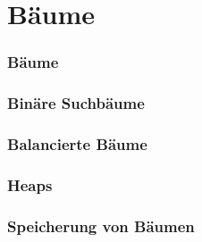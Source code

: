 \documentclass[handout, xcolor=dvipsnames]{beamer}
\subtitle{Baumstrukturen}
\begin{document}
\maketitle

\part{Bäume}

\section{Bäume}
	
\section{Binäre Suchbäume}
			
		
\section{Balancierte Bäume}
	
	
	
	


\section{Heaps}
	
	
	

\section{Speicherung von Bäumen}
	
\end{document}
